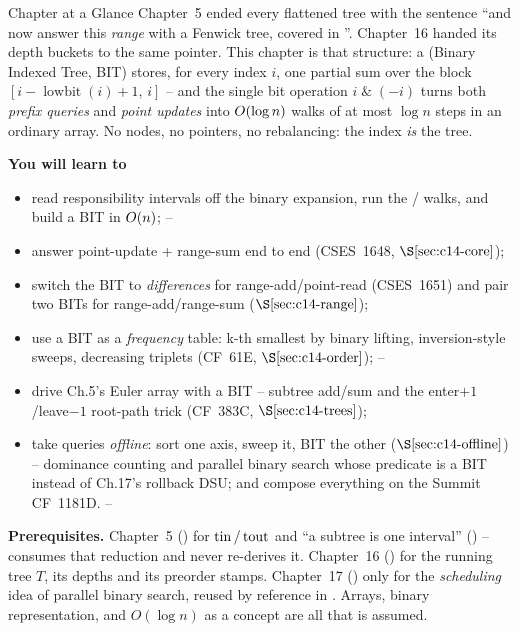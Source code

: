 \begin{chaptertheorybox}{Chapter at a Glance}
Chapter~5 ended every flattened tree with the sentence ``and now answer this
\emph{range} with a Fenwick tree, covered in ''.  Chapter~16 handed
its depth buckets to the same pointer.  This chapter is that structure: a
 (Binary Indexed Tree, BIT) stores, for every index \(i\),
one partial sum over the block \([i-\operatorname{lowbit}(i)+1,\,i]\) -- and
the single bit operation \(i\;\&\;(-i)\) turns both \emph{prefix queries} and
\emph{point updates} into \(O(\log n)\) walks of at most \(\log n\) steps
in an ordinary array.  No nodes, no pointers, no rebalancing: the index
\emph{is} the tree.

\textbf{You will learn to}
\begin{itemize}[nosep]
  \item read responsibility intervals off the binary expansion, run the
        / walks, and build a BIT in \(O(n)\);
        \hfill{}--
  \item answer point-update + range-sum end to end (CSES~1648, \(\secref{c14-core}\)); \hfill{}
  \item switch the BIT to \emph{differences} for range-add/point-read
        (CSES~1651) and pair two BITs for range-add/range-sum (\(\secref{c14-range}\)); \hfill{}
  \item use a BIT as a \emph{frequency} table: k-th smallest by binary
        lifting, inversion-style sweeps, decreasing triplets (CF~61E,
        \(\secref{c14-order}\)); \hfill{}--
  \item drive Ch.5's Euler array with a BIT -- subtree add/sum and the
        enter\(+1\)/leave\(-1\) root-path trick (CF~383C, \(\secref{c14-trees}\)); \hfill{}
  \item take queries \emph{offline}: sort one axis, sweep it, BIT the other
        (\(\secref{c14-offline}\)) -- dominance counting and parallel binary
        search whose predicate is a BIT instead of Ch.17's rollback DSU; and
        compose everything on the Summit CF~1181D. \hfill{}--
\end{itemize}

\textbf{Prerequisites.} Chapter~5 () for \(\operatorname{tin}/\operatorname{tout}\) and
``a subtree is one interval'' () -- 
consumes that reduction and never re-derives it.  Chapter~16 ()
for the running tree \(T\), its depths and its preorder stamps.  Chapter~17
() only for the \emph{scheduling} idea of parallel binary search,
reused by reference in .  Arrays, binary representation,
and \(O(\log n)\) as a concept are all that is assumed.
\end{chaptertheorybox}

